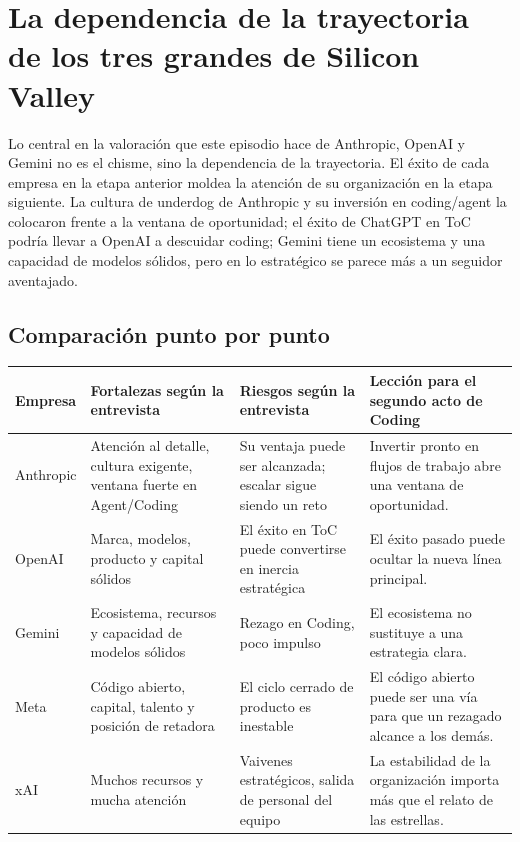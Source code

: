 \section{La dependencia de la trayectoria de los tres grandes de Silicon Valley}

Lo central en la valoración que este episodio hace de Anthropic, OpenAI y Gemini no es el chisme, sino la dependencia de la trayectoria. El éxito de cada empresa en la etapa anterior moldea la atención de su organización en la etapa siguiente. La cultura de underdog de Anthropic y su inversión en coding/agent la colocaron frente a la ventana de oportunidad; el éxito de ChatGPT en ToC podría llevar a OpenAI a descuidar coding; Gemini tiene un ecosistema y una capacidad de modelos sólidos, pero en lo estratégico se parece más a un seguidor aventajado.

\subsection{Comparación punto por punto}

\noindent\begin{longtable}{p{}p{}p{}p{}}
\toprule
Empresa & Fortalezas según la entrevista & Riesgos según la entrevista & Lección para el segundo acto de Coding \\
\midrule
Anthropic & Atención al detalle, cultura exigente, ventana fuerte en Agent/Coding & Su ventaja puede ser alcanzada; escalar sigue siendo un reto & Invertir pronto en flujos de trabajo abre una ventana de oportunidad. \\
OpenAI & Marca, modelos, producto y capital sólidos & El éxito en ToC puede convertirse en inercia estratégica & El éxito pasado puede ocultar la nueva línea principal. \\
Gemini & Ecosistema, recursos y capacidad de modelos sólidos & Rezago en Coding, poco impulso & El ecosistema no sustituye a una estrategia clara. \\
Meta & Código abierto, capital, talento y posición de retadora & El ciclo cerrado de producto es inestable & El código abierto puede ser una vía para que un rezagado alcance a los demás. \\
xAI & Muchos recursos y mucha atención & Vaivenes estratégicos, salida de personal del equipo & La estabilidad de la organización importa más que el relato de las estrellas. \\
\bottomrule
\end{longtable}

